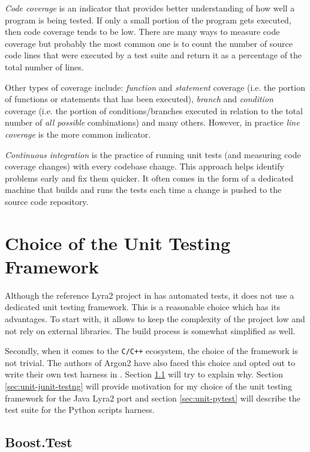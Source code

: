 \emph{Code coverage} is an indicator that provides better understanding of how well a program is being tested. If only a small portion of the program gets executed, then code coverage tends to be low. There are many ways to measure code coverage but probably the most common one is to count the number of source code lines that were executed by a test suite and return it as a percentage of the total number of lines.

Other types of coverage include: \emph{function} and \emph{statement} coverage (i.e. the portion of functions or statements that has been executed), \emph{branch} and \emph{condition} coverage (i.e. the portion of conditions/branches executed in relation to the total number of \emph{all possible} combinations) and many others. However, in practice \emph{line coverage} is the more common indicator.

\emph{Continuous integration} is the practice of running unit tests (and measuring code coverage changes) with every codebase change. This approach helps identify problems early and fix them quicker. It often comes in the form of a dedicated machine that builds and runs the tests each time a change is pushed to the source code repository.

\section{Choice of the Unit Testing Framework}

Although the reference Lyra2 project in \cite{github:2017:lyra} has automated tests, it does not use a dedicated unit testing framework. This is a reasonable choice which has its advantages. To start with, it allows to keep the complexity of the project low and not rely on external libraries. The build process is somewhat simplified as well.

Secondly, when it comes to the \texttt{C/C++} ecosystem, the choice of the framework is not trivial. The authors of Argon2 have also faced this choice and opted out to write their own test harness in \cite{github:2017:argon2-test.c}. Section \ref{sec:unit-boost-google} will try to explain why. Section \ref{sec:unit-junit-testng} will provide motivation for my choice of the unit testing framework for the Java Lyra2 port and section \ref{sec:unit-pytest} will describe the test suite for the Python scripts harness.

\subsection{Boost.Test}
\label{sec:unit-boost-google}

